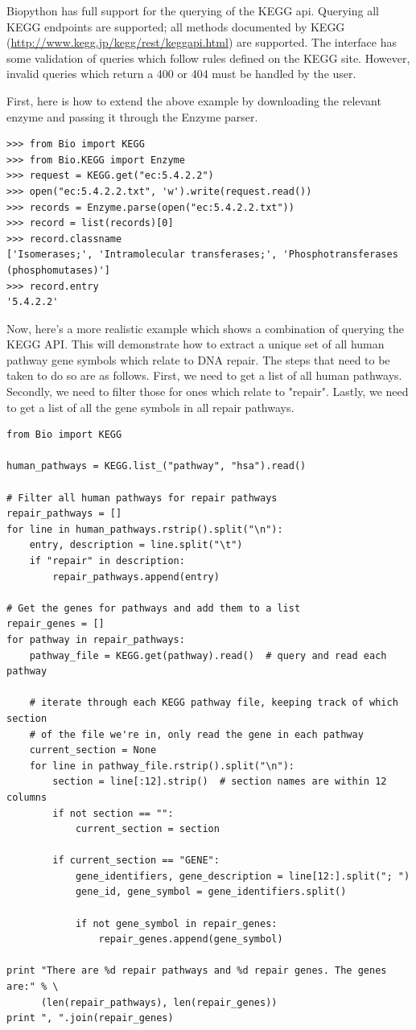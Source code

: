 \documentclass{report}
\begin{document}
Biopython has full support for the querying of the KEGG api. Querying all KEGG endpoints are supported; all methods documented by KEGG (\url{http://www.kegg.jp/kegg/rest/keggapi.html}) are supported. The interface has some validation of queries which follow rules defined on the KEGG site. However, invalid queries which return a 400 or 404 must be handled by the user.

First, here is how to extend the above example by downloading the relevant enzyme and passing it through the Enzyme parser.

\begin{verbatim}
>>> from Bio import KEGG
>>> from Bio.KEGG import Enzyme
>>> request = KEGG.get("ec:5.4.2.2")
>>> open("ec:5.4.2.2.txt", 'w').write(request.read())
>>> records = Enzyme.parse(open("ec:5.4.2.2.txt"))
>>> record = list(records)[0]
>>> record.classname
['Isomerases;', 'Intramolecular transferases;', 'Phosphotransferases (phosphomutases)']
>>> record.entry
'5.4.2.2'
\end{verbatim}

Now, here's a more realistic example which shows a combination of querying the KEGG API. This will demonstrate how to extract a unique set of all human pathway gene symbols which relate to DNA repair. The steps that need to be taken to do so are as follows. First, we need to get a list of all human pathways. Secondly, we need to filter those for ones which relate to "repair". Lastly, we need to get a list of all the gene symbols in all repair pathways.

\begin{verbatim}
from Bio import KEGG

human_pathways = KEGG.list_("pathway", "hsa").read()

# Filter all human pathways for repair pathways
repair_pathways = []
for line in human_pathways.rstrip().split("\n"):
    entry, description = line.split("\t")
    if "repair" in description:
        repair_pathways.append(entry)

# Get the genes for pathways and add them to a list
repair_genes = [] 
for pathway in repair_pathways:
    pathway_file = KEGG.get(pathway).read()  # query and read each pathway

    # iterate through each KEGG pathway file, keeping track of which section
    # of the file we're in, only read the gene in each pathway
    current_section = None
    for line in pathway_file.rstrip().split("\n"):
        section = line[:12].strip()  # section names are within 12 columns
        if not section == "":
            current_section = section
        
        if current_section == "GENE":
            gene_identifiers, gene_description = line[12:].split("; ")
            gene_id, gene_symbol = gene_identifiers.split()

            if not gene_symbol in repair_genes:
                repair_genes.append(gene_symbol)

print "There are %d repair pathways and %d repair genes. The genes are:" % \
      (len(repair_pathways), len(repair_genes))
print ", ".join(repair_genes)
\end{verbatim}
\end{document}
